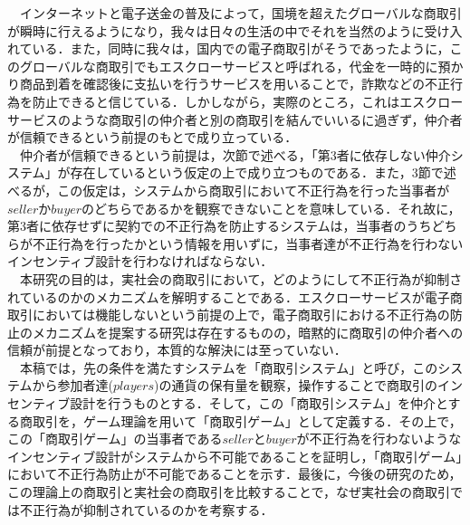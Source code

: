 \documentclass[twocolumn, a4j]{article}
\begin{document}
  　インターネットと電子送金の普及によって，国境を超えたグローバルな商取引が瞬時に行えるようになり，我々は日々の生活の中でそれを当然のように受け入れている．また，同時に我々は，国内での電子商取引がそうであったように，このグローバルな商取引でもエスクローサービスと呼ばれる，代金を一時的に預かり商品到着を確認後に支払いを行うサービスを用いることで，詐欺などの不正行為を防止できると信じている．しかしながら，実際のところ，これはエスクローサービスのような商取引の仲介者と別の商取引を結んでいいるに過ぎず，仲介者が信頼できるという前提のもとで成り立っている．\\
  　仲介者が信頼できるという前提は，次節で述べる，「第3者に依存しない仲介システム」が存在しているという仮定の上で成り立つものである．また，3節で述べるが，この仮定は，システムから商取引において不正行為を行った当事者が$seller$か$buyer$のどちらであるかを観察できないことを意味している．それ故に，第3者に依存せずに契約での不正行為を防止するシステムは，当事者のうちどちらが不正行為を行ったかという情報を用いずに，当事者達が不正行為を行わないインセンティブ設計を行わなければならない．\\
  　本研究の目的は，実社会の商取引において，どのようにして不正行為が抑制されているのかのメカニズムを解明することである．エスクローサービスが電子商取引においては機能しないという前提の上で，電子商取引における不正行為の防止のメカニズムを提案する研究\cite{Shigeo 2000}は存在するものの，暗黙的に商取引の仲介者への信頼が前提となっており，本質的な解決には至っていない．\\
  　本稿では，先の条件を満たすシステムを「商取引システム」と呼び，このシステムから参加者達($players$)の通貨の保有量を観察，操作することで商取引のインセンティブ設計を行うものとする．そして，この「商取引システム」を仲介とする商取引を，ゲーム理論を用いて「商取引ゲーム」として定義する．その上で，この「商取引ゲーム」の当事者である$seller$と$buyer$が不正行為を行わないようなインセンティブ設計がシステムから不可能であることを証明し，「商取引ゲーム」において不正行為防止が不可能であることを示す．最後に，今後の研究のため，この理論上の商取引と実社会の商取引を比較することで，なぜ実社会の商取引では不正行為が抑制されているのかを考察する．\\
\end{document}
